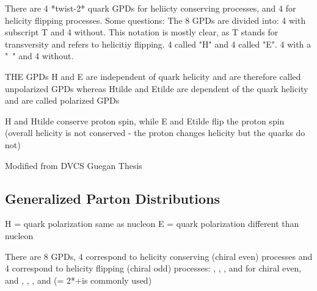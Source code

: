 There are 4 *twist-2* quark GPDs for heliicty conserving processes, and 4 for helicity flipping processes. Some questions:
The 8 GPDs are divided into: 4 with subscript T and 4 without. This notation is mostly clear, as T stands for transversity and refers to helicitiy flipping.  4 called "H" and 4 called "E".  4 with a "~" and 4 without. 








THE GPDs H and E are independent of quark helicity and are therefore called unpolarized GPDs whereas Htilde and Etilde are dependent of the quark helicity and are called polarized GPDs

H and Htilde conserve proton spin, while E and Etilde flip the proton spin (overall helicity is not conserved - the proton changes helicity but the quarks do not) 

Modified from DVCS Guegan Thesis






\subsection{Generalized Parton Distributions}\label{sec:ch1sec2GPDs}

H = quark polarization same as nucleon
E = quark polarization different than nucleon


    There are 8 GPDs, 4 correspond to helicity conserving (chiral even) processes and 4 correspond to helicity flipping (chiral odd) processes: \GPDH,  \GPDE,  \GPDHtilde,  and \GPDEtilde  \quad for chiral even, and \GPDHT,  \GPDET,  \GPDHTtilde, and \GPDETtilde \quad (\GPDETbar = 2*\GPDHTtilde+\GPDET is commonly used)
    
